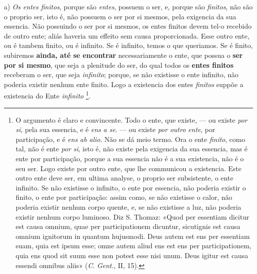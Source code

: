 a) \emph{Os entes finitos}, porque são \emph{entes}, possuem o ser, e, porque são \emph{finitos}, não são o proprio ser, isto é, não possuem o ser por si mesmos, pela exigencia da sua essencia. Não possuindo o ser por si mesmos, os entes finitos devem tel-o recebido de outro ente; aliás haveria um effeito sem causa proporcionada. Esse outro ente, ou é tambem finito, ou é infinito. Se é infinito, temos o que queriamos. Se é finito, subiremos \textbf{ainda, até se encontrar} necessariamente o ente, que possua o \textbf{ser} \textbf{por si mesmo}, que seja a plenitude do ser, do qual todos os \textbf{entes finitos} receberam o ser, que seja \emph{infinito}; porque, se não existisse o ente infinito, não poderia existir nenhum ente finito. Logo a existencia dos entes \emph{finitos} suppõe a existencia do Ente \emph{infinito} \footnote{O argumento é claro e convincente. Todo o ente, que existe, --- ou existe \emph{por si}, pela sua essencia, e é \emph{ens a se}. --- ou existe \emph{por outro ente}, por participação, e é \emph{ens ab alio}. Não se dá meio termo. Ora o ente \emph{finito}, como tal, não é ente \emph{por si}, isto é, não existe pela exigencia da sua essencia, mas é ente por participação, porque a sua essencia não é a sua existencia, não é o seu ser. Logo existe por outro ente, que lhe communicou a existencia. Este outro ente deve ser, em ultima analyse, o proprio ser subsistente, o ente infinito. Se não existisse o infinito, o ente por essencia, não poderia existir o finito, o ente por participação: assim como, se não existisse o calor, não poderia existir nenhum corpo quente, e, se não existisse a luz, não poderia existir nenhum corpo luminoso. Diz S. Thomaz: «Quod per essentiam dicitur est causa omnium, quae per participationem dicuntur, sicutignis est causa omnium ignitorum in quantum hujusmodi. Deus autem est ens per essentiam suam, quia est ipsum esse; omne autem aliud ens est ens per participationem, quia ens quod sit suum esse non potest esse nisi unum. Deus igitur est causa essendi omnibus aliis» (\emph{C}. \emph{Gent}., II, 15).}.
